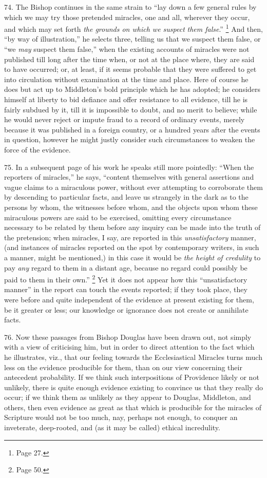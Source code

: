 74.
The Bishop continues in the same strain to ``lay down a few general
rules by which we may try those pretended miracles, one and all,
wherever they occur, and which may set forth \emph{the grounds on which
we suspect} \emph{them false}.'' \footnote{Page 27.} And then, ``by way of illustration,'' he selects three, telling
us that we suspect them false, or ``we \emph{may} suspect them false,''
when the existing accounts of miracles were not published till long
after the time when, or not at the place where, they are said to have
occurred; or, at least, if it seems probable that they were suffered
to get into circulation without examination at the time and place.
Here of course he does but act up to Middleton's bold principle which
he has adopted; he considers himself at liberty to bid defiance and
offer resistance to all evidence, till he is fairly subdued by it,
till it is impossible to doubt, and no merit to believe; while he
would never reject or impute fraud to a record of ordinary events,
merely because it was published in a foreign country, or a hundred
years after the events in question, however he might justly consider
such circumstances to weaken the force of the evidence.

75.
In a subsequent page of his work he speaks still more pointedly: ``When
the reporters of miracles,'' he says, ``content themselves with general
assertions and vague claims to a miraculous power, without ever
attempting to corroborate them by descending to particular facts, and
leave us strangely in the dark as to the persons by whom, the
witnesses before whom, and the objects upon whom these miraculous
powers are said to be exercised, omitting every circumstance necessary to be related by them before any inquiry can be made into
the truth of the pretension; when miracles, I say, are reported in
this \emph{unsatisfactory} manner, (and instances of miracles reported
on the spot by contemporary writers, in such a manner, might be
mentioned,) in this case it would be \emph{the height of credulity} to
pay \emph{any} regard to them in a distant age, because no regard
could possibly be paid to them in their own.'' \footnote{Page 50.} Yet it does not appear how this ``unsatisfactory manner'' in the
report can touch the events reported; if they took place, they were
before and quite independent of the evidence at present existing for
them, be it greater or less; our knowledge or ignorance does not
create or annihilate facts.

76.
Now these passages from Bishop Douglas have been drawn out, not simply
with a view of criticising him, but in order to direct attention to
the fact which he illustrates, viz., that our feeling towards the
Ecclesiastical Miracles turns much less on the evidence producible for
them, than on our view concerning their antecedent probability. If we
think such interpositions of Providence likely or not unlikely, there
is quite enough evidence existing to convince us that they really do
occur; if we think them as unlikely as they appear to Douglas,
Middleton, and others, then even evidence as great as that which is
producible for the miracles of Scripture would not be too much, nay, perhaps not enough, to conquer an inveterate, deep-rooted, and
(as it may be called) ethical incredulity.

